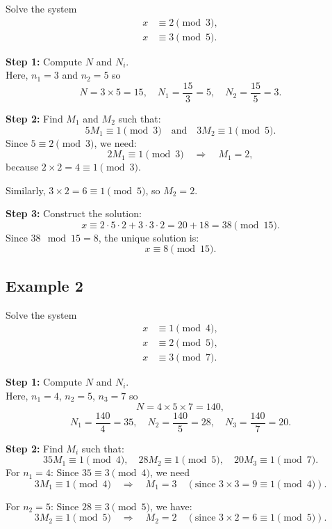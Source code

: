 \documentclass[12pt]{article}
\theoremstyle{definition} %
\theoremstyle{plain} %
\begin{document}
Solve the system
\[
\begin{aligned}
x &\equiv 2 \pmod{3}, \\
x &\equiv 3 \pmod{5}.
\end{aligned}
\]

\noindent\textbf{Step 1:} Compute \(N\) and \(N_i\). \\
Here, \(n_1 = 3\) and \(n_2 = 5\) so
\[
N = 3 \times 5 = 15, \quad N_1 = \frac{15}{3} = 5, \quad N_2 = \frac{15}{5} = 3.
\]

\noindent\textbf{Step 2:} Find \(M_1\) and \(M_2\) such that:
\[
5M_1 \equiv 1 \pmod{3} \quad \text{and} \quad 3M_2 \equiv 1 \pmod{5}.
\]
Since \(5 \equiv 2 \pmod{3}\), we need:
\[
2M_1 \equiv 1 \pmod{3} \quad \Longrightarrow \quad M_1 = 2,
\]
because \(2 \times 2 = 4 \equiv 1 \pmod{3}\).

Similarly, \(3 \times 2 = 6 \equiv 1 \pmod{5}\), so \(M_2 = 2\).

\noindent\textbf{Step 3:} Construct the solution:
\[
x \equiv 2 \cdot 5 \cdot 2 + 3 \cdot 3 \cdot 2 = 20 + 18 = 38 \pmod{15}.
\]
Since \(38 \mod 15 = 8\), the unique solution is:
\[
x \equiv 8 \pmod{15}.
\]

\subsection*{Example 2}

Solve the system
\[
\begin{aligned}
x &\equiv 1 \pmod{4}, \\
x &\equiv 2 \pmod{5}, \\
x &\equiv 3 \pmod{7}.
\end{aligned}
\]

\noindent\textbf{Step 1:} Compute \(N\) and \(N_i\). \\
Here, \(n_1 = 4\), \(n_2 = 5\), \(n_3 = 7\) so
\[
N = 4 \times 5 \times 7 = 140,
\]
\[
N_1 = \frac{140}{4} = 35, \quad N_2 = \frac{140}{5} = 28, \quad N_3 = \frac{140}{7} = 20.
\]

\noindent\textbf{Step 2:} Find \(M_i\) such that:
\[
35M_1 \equiv 1 \pmod{4}, \quad 28M_2 \equiv 1 \pmod{5}, \quad 20M_3 \equiv 1 \pmod{7}.
\]
For \(n_1=4\): Since \(35 \equiv 3 \pmod{4}\), we need
\[
3M_1 \equiv 1 \pmod{4} \quad \Longrightarrow \quad M_1 = 3 \quad (\text{since } 3 \times 3 = 9 \equiv 1 \pmod{4}).
\]

For \(n_2=5\): Since \(28 \equiv 3 \pmod{5}\), we have:
\[
3M_2 \equiv 1 \pmod{5} \quad \Longrightarrow \quad M_2 = 2 \quad (\text{since } 3 \times 2 = 6 \equiv 1 \pmod{5}).
\]
\end{document}
